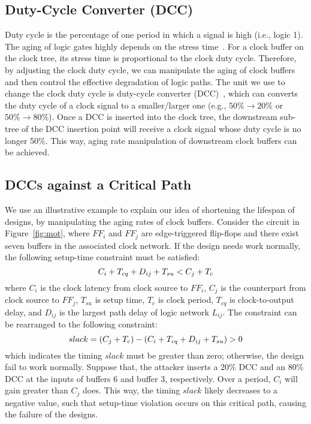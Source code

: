 \subsection{Duty-Cycle Converter (DCC)}
Duty cycle is the percentage of one period in which a signal is high (i.e., logic 1). The aging of logic gates highly depends on the stress time~\cite{wang2010impact}. For a clock buffer on the clock tree, its stress time is proportional to the clock duty cycle. Therefore, by adjusting the clock duty cycle, we can manipulate the aging of clock buffers and then control the effective degradation of logic paths. The unit we use to change the clock duty cycle is duty-cycle converter (DCC)~\cite{wu2018maui}, which can converts the duty cycle of a clock signal to a smaller/larger one (e.g., $50\% \rightarrow 20\%$ or $50\% \rightarrow 80\%$). Once a DCC is inserted into the clock tree, the downstream sub-tree of the DCC insertion point will receive a clock signal whose duty cycle is no longer 50\%. This way, aging rate manipulation of downstream clock buffers can be achieved.
\subsection{DCCs against a Critical Path}
We use an illustrative example to explain our idea of shortening the lifespan of designs, by manipulating the aging rates of clock buffers. Consider the circuit in Figure~\ref{fig:mot}, where $FF_{i}$ and $FF_{j}$ are edge-triggered flip-flops and there exist seven buffers in the associated clock network. If the design needs work normally, the following setup-time constraint must be satisfied:
\begin{equation}
	\label{eq:setup}
	\fontsize{8}{9} \selectfont
	C_{i} + T_{cq} + D_{ij} + T_{su} < C_{j} + T_{c}
\end{equation}
where $C_{i}$ is the clock latency from clock source to $FF_{i}$, $C_{j}$ is the counterpart from clock source to $FF_{j}$, $T_{su}$ is setup time, $T_{c}$ is clock period, $T_{cq}$ is clock-to-output delay, and $D_{ij}$ is the largest path delay of logic network $L_{ij}$. The constraint can be rearranged to the following constraint: 
\begin{equation}
	\label{eq:setup}
	slack = (C_{j} + T_{c}) - (C_{i}  + T_{cq} + D_{ij} + T_{su}) > 0 
	\fontsize{8}{9} \selectfont
\end{equation}
which indicates the timing $slack$ must be greater than zero; otherwise, the design fail to work normally. Suppose that, the attacker inserts a 20\% DCC and an 80\% DCC at the inputs of buffers 6 and buffer 3, respectively. Over a period, $C_{i}$ will gain greater than $C_{j}$ does. This way, the timing $slack$ likely decreases to a negative value, such that setup-time violation occurs on this critical path, causing the failure of the designs.
